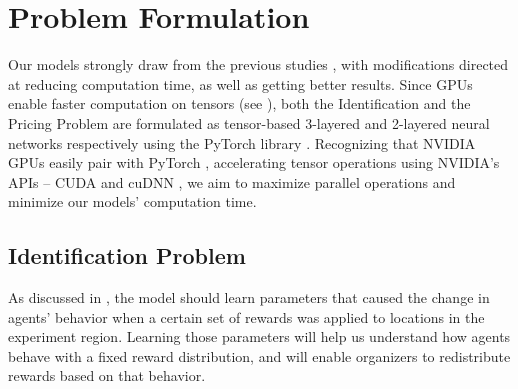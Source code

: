 \chapter{Problem Formulation} \label{sec:Problem Formulation}
Our models strongly draw from the previous studies \cite{Xue2016Avi2, Xue2016Avi1}, with modifications directed at reducing computation time, as well as getting better results. Since GPUs enable faster computation on tensors (see ), both the Identification and the Pricing Problem are formulated as tensor-based 3-layered and 2-layered neural networks respectively using the PyTorch library \cite{PTDocs}. Recognizing that NVIDIA GPUs easily pair with PyTorch \cite{PTDocs}, accelerating tensor operations using NVIDIA's APIs -- CUDA and cuDNN \cite{CUDADocs, cuDNNPaper}, we aim to maximize parallel operations and minimize our models' computation time.

\section{Identification Problem} \label{sec:Identification Problem}
As discussed in , the model should learn parameters that caused the change in agents' behavior when a certain set of rewards was applied to locations in the experiment region. Learning those parameters will help us understand how agents behave with a fixed reward distribution, and will enable organizers to redistribute rewards based on that behavior.

